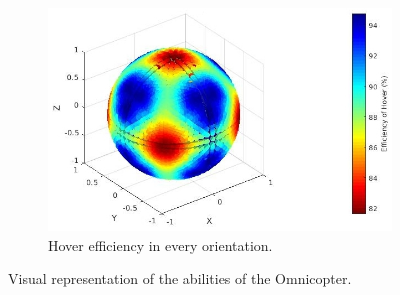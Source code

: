 \begin{figure}[!ht]
\begin{center}
\begin{subfigure}[b]{0.45\textwidth}
  \end{subfigure}
  \begin{subfigure}[b]{0.45\textwidth}
    \includegraphics[width=\linewidth]{images/Omnicopter_hspace.jpg}
    \caption{Hover efficiency in every orientation.} \label{fig:Omnicopter_hspace}
  \end{subfigure}
  \caption{Visual representation of the abilities of the Omnicopter.}
  \label{fig:Omnicopter_spaces}
  \end{center}
\end{figure}

\begin{table}[!ht]
\begin{center}
 \caption{Information on the designs’ force space properties.}\vspace{1ex}
 \label{tab:tab_Octa_compare_force}
\end{center}
\end{table}

